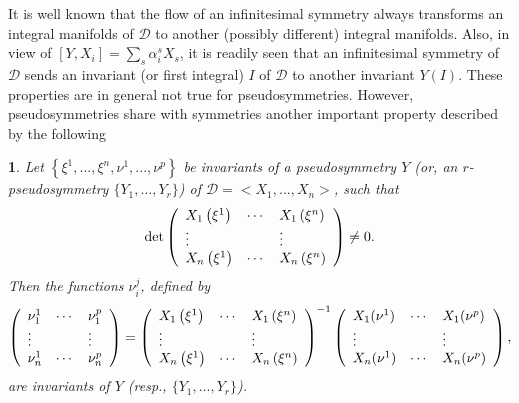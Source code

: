 \documentclass[12pt,english]{elsarticle}
\theoremstyle{plain}
\theoremstyle{plain}
\newtheorem{prop}[thm]{\protect\propositionname}
\theoremstyle{remark}
\theoremstyle{plain}
\theoremstyle{definition}
\theoremstyle{definition}
\providecommand{\propositionname}{Proposition}
\begin{document}
It is well known that the flow of an infinitesimal symmetry always transforms
an integral manifolds of $\mathcal{D}$ to another (possibly different)
integral manifolds. Also, in view of
$[Y,X_{i}]=\sum _{s}\alpha _{i}^{s}X_{s}$, it is readily seen that an infinitesimal
symmetry of $\mathcal{D}$ sends an invariant (or first integral) $I$ of
$\mathcal{D}$ to another invariant $Y(I)$. These properties are in general
not true for pseudosymmetries. However, pseudosymmetries share with symmetries
another important property described by the following
%
\begin{prop}
\label{prop:9}%
Let $\left \{ \xi ^{1},...,\xi ^{n},\nu ^{1},...,\nu ^{p}\right \} $ be
invariants of a pseudosymmetry $Y$ (or, an $r$-pseudosymmetry
$\{Y_{1},...,Y_{r}\}$) of $\mathcal{D}=<X_{1},...,X_{n}>$, such that
%
\begin{equation*}
\det \left (
%
\begin{array}{l@{\quad}l@{\quad}l}
X_{1}\left (\xi ^{1}\right ) & \cdots & X_{1}\left (\xi ^{n}\right )
\\
\vdots & & \vdots
\\
X_{n}\left (\xi ^{1}\right ) & \cdots & X_{n}\left (\xi ^{n}\right )
\end{array}
%
\right )\neq 0.
\end{equation*}
%
Then the functions $\nu _{i}^{j}$, defined by
%
\begin{equation}
\left (
%
\begin{array}{l@{\quad}l@{\quad}l}
\nu _{1}^{1} & \cdots & \nu _{1}^{p}
\\
\vdots & & \vdots
\\
\nu _{n}^{1} & \cdots & \nu _{n}^{p}
\end{array}
%
\right )=\left (
%
\begin{array}{l@{\quad}l@{\quad}l}
X_{1}\left (\xi ^{1}\right ) & \cdots & X_{1}\left (\xi ^{n}\right )
\\
\vdots & & \vdots
\\
X_{n}\left (\xi ^{1}\right ) & \cdots & X_{n}\left (\xi ^{n}\right )
\end{array}
%
\right )^{-1}\left (
%
\begin{array}{l@{\quad}l@{\quad}l}
X_{1}(\nu ^{1}) & \cdots & X_{1}(\nu ^{p})
\\
\vdots & & \vdots
\\
X_{n}(\nu ^{1}) & \cdots & X_{n}(\nu ^{p})
\end{array}
%
\right ),
\label{eq:Prol_invar_pseudo}
\end{equation}
%
are invariants of $Y$ (resp., $\{Y_{1},...,Y_{r}\}$).
\end{prop}
\end{document}
